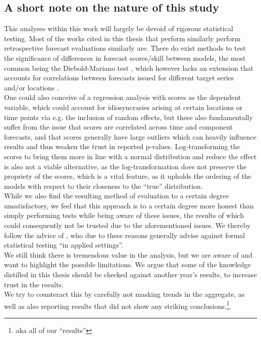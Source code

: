 \subsection{A short note on the nature of this study}
This analyses within this work will largely be devoid of rigorous statistical testing. Most of the works cited in this thesis that perform similarly perform retrospective forecast evaluations similarly are. There do exist methods to test the significance of differences in forecast scores/skill between models, the most common being the Diebold-Mariano test \citep{diebold_comparing_1995}, which however lacks an extension that accounts for correlations between forecasts issued for different target series and/or locations \citep{bracher_evaluating_2021}. \\
One could also conceive of a regression analysis with scores as the dependent variable, which could account for idiosyncrasies arising at certain locations or time points via e.g. the inclusion of random effects, but these also fundamentally suffer from the issue that scores are correlated across time and component forecasts, and that scores generally have large outliers which can heavily influence results and thus weaken the trust in reported p-values. Log-transforming the scores to bring them more in line with a normal distribution and reduce the effect is also not a viable alternative, as the log-transformation does not preserve the propriety of the scores, which is a vital feature, as it upholds the ordering of the models with respect to their closeness to the ``true'' distribution.\\ 
While we also find the resulting method of evaluation to a certain degree unsatisfactory, we feel that this approach is to a certain degree more honest than simply performing tests while being aware of these issues, the results of which could consequently not be trusted due to the aforementioned issues. We thereby follow the advice of \cite{bosse_evaluating_2022}, who due to these reasons generally advise against formal statistical testing ``in applied settings''.\\ 
We still think there is tremendous value in the analysis, but we are aware of and want to highlight the possible limitations. We argue that some of the knowledge distilled in this thesis should be checked against another year's results, to increase trust in the results. \\ 
We try to counteract this by carefully not masking trends in the aggregate, as well as also reporting results that did not show any striking conclusions.\footnote{aka all of our ``results''}. %
